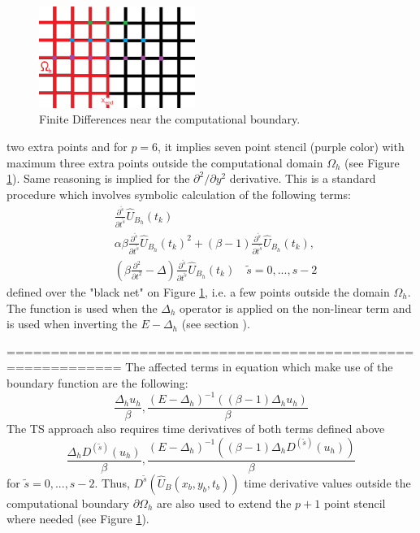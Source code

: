 \documentclass[11pt,a4paper,twoside]{article}
\begin{document}
\begin{figure}[ht]%
\begin{center}
\includegraphics[width=2in]{Pictures/BoundaryPicture.png}
	\caption{Finite Differences near the computational boundary.}
	\label{fig:BoundaryFD}
  \end{center}
\end{figure}
two extra points and for $p=6$, it implies seven point stencil (purple color) with maximum three extra points outside the computational domain $\Omega_h$ (see Figure \ref{fig:BoundaryFD}). Same reasoning is implied for the $\partial^2 / \partial y^2$ derivative. This is a standard procedure which involves symbolic calculation of the following terms:
\begin{align}
& \frac{ \partial^{\tilde s} } { \partial t^{\tilde s} } \widehat U_{B_h}(t_k)
\\
& \alpha \beta \frac{ \partial^{\tilde s} } { \partial t^{\tilde s} } \widehat U_{B_h}(t_k)^2  + (\beta -1)\frac{ \partial^{\tilde s} } { \partial t^{\tilde s} }\widehat U_{B_h}(t_k), \label{nonLinBnd}
\\
& (\beta \frac{ \partial^2 } { \partial t^2 } - \Delta)\frac{ \partial^{\tilde s} } { \partial t^{\tilde s} } \widehat U_{B_h}(t_k) \quad \tilde s = 0,...,s-2 \label{psnBnd}
\end{align}
defined over the "black net" on Figure \ref{fig:BoundaryFD}, i.e. a few points outside the domain $\Omega_h$. The function  is used when the $\Delta_h$ operator is applied on the non-linear term and  is used when inverting the $E - \Delta_h$ (see section ).
\iffalse

===========================================================
 The affected terms in equation  which make use of the boundary function  are the following:
\begin{equation*}
\frac{ \Delta_h u_h}{\beta}, \frac{ (E - \Delta_h)^{-1} ( (\beta -1)\Delta_h u_h) }{\beta}
\end{equation*}
The TS approach also requires time derivatives of both terms defined above
\begin{equation*}
\frac{ \Delta_h D^{(\tilde s)} (u_h)}{\beta}, \frac{ (E - \Delta_h)^{-1} ( (\beta -1)\Delta_h D^{(\tilde s)}(u_h) ) }{\beta}
\end{equation*}
for $\tilde s = 0, ..., s-2$.  Thus, $D^{\tilde s}(\widehat U_B(x_b , y_b, t_b))$  time derivative values outside the computational boundary $\partial \Omega_h$ are also used to extend the $p+1$ point stencil where needed (see Figure  \ref{fig:BoundaryFD}). 
\end{document}
